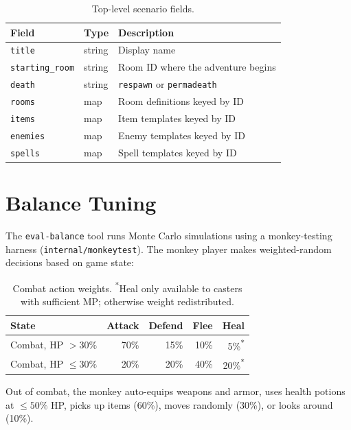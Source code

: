 \documentclass[a4paper,10pt]{article}
\newcommand{\field}[1]{\texttt{#1}}
\begin{document}
\begin{table}[h]
\centering
\begin{tabular}{@{}llp{7cm}@{}}
\toprule
\textbf{Field} & \textbf{Type} & \textbf{Description} \\
\midrule
\field{title}         & string & Display name \\
\field{starting\_room} & string & Room ID where the adventure begins \\
\field{death}         & string & \texttt{respawn} or \texttt{permadeath} \\
\field{rooms}         & map    & Room definitions keyed by ID \\
\field{items}         & map    & Item templates keyed by ID \\
\field{enemies}       & map    & Enemy templates keyed by ID \\
\field{spells}        & map    & Spell templates keyed by ID \\
\bottomrule
\end{tabular}
\caption{Top-level scenario fields.}
\end{table}

\section{Balance Tuning}

The \texttt{eval-balance} tool runs Monte Carlo simulations using a
monkey-testing harness (\texttt{internal/monkeytest}). The monkey player
makes weighted-random decisions based on game state:

\begin{table}[h]
\centering
\begin{tabular}{@{}lrrrr@{}}
\toprule
\textbf{State} & \textbf{Attack} & \textbf{Defend} & \textbf{Flee} & \textbf{Heal} \\
\midrule
Combat, HP $> 30\%$  & 70\% & 15\% & 10\% & 5\%\textsuperscript{*} \\
Combat, HP $\leq 30\%$ & 20\% & 20\% & 40\% & 20\%\textsuperscript{*} \\
\bottomrule
\end{tabular}
\caption{Combat action weights. \textsuperscript{*}Heal only available to
         casters with sufficient MP; otherwise weight redistributed.}
\end{table}

Out of combat, the monkey auto-equips weapons and armor, uses health
potions at $\leq 50\%$ HP, picks up items (60\%), moves randomly (30\%),
or looks around (10\%).
\end{document}
